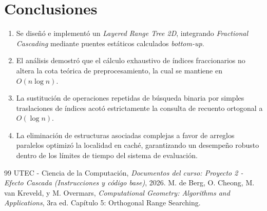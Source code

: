\documentclass[10pt,twocolumn,a4paper]{article}
\begin{document}
\section{Conclusiones}
\begin{enumerate}[leftmargin=*]
    \item Se diseñó e implementó un \textit{Layered Range Tree 2D}, integrando \textit{Fractional Cascading} mediante puentes estáticos calculados \textit{bottom-up}.
    \item El análisis demostró que el cálculo exhaustivo de índices fraccionarios no altera la cota teórica de preprocesamiento, la cual se mantiene en $O(n \log n)$.
    \item La sustitución de operaciones repetidas de búsqueda binaria por simples traslaciones de índices acotó estrictamente la consulta de recuento ortogonal a $O(\log n)$.
    \item La eliminación de estructuras asociadas complejas a favor de arreglos paralelos optimizó la localidad en caché, garantizando un desempeño robusto dentro de los límites de tiempo del sistema de evaluación.
\end{enumerate}

\begin{thebibliography}{99}
UTEC - Ciencia de la Computación, \textit{Documentos del curso: Proyecto 2 - Efecto Cascada (Instrucciones y código base)}, 2026.
M. de Berg, O. Cheong, M. van Kreveld, y M. Overmars, \textit{Computational Geometry: Algorithms and Applications}, 3ra ed. Capítulo 5: Orthogonal Range Searching.
\end{thebibliography}
\end{document}

